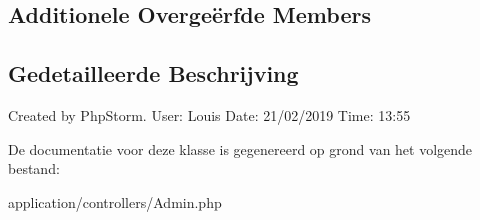 \subsection*{Additionele Overge\"{e}rfde Members}


\subsection{Gedetailleerde Beschrijving}
Created by Php\+Storm. User\+: Louis Date\+: 21/02/2019 Time\+: 13\+:55 

De documentatie voor deze klasse is gegenereerd op grond van het volgende bestand\+:\begin{DoxyCompactItemize}
\item 
application/controllers/Admin.\+php\end{DoxyCompactItemize}
